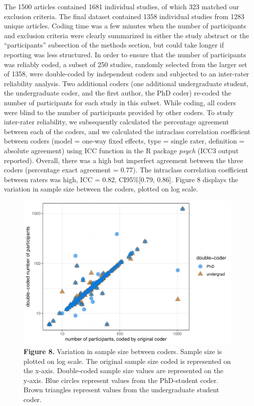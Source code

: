 \documentclass[
  man,floatsintext]{apa6}
\begin{document}
The 1500 articles contained 1681 individual studies, of which 323 matched our exclusion criteria. The final dataset contained 1358 individual studies from 1283 unique articles. Coding time was a few minutes when the number of participants and exclusion criteria were clearly summarized in either the study abstract or the ``participants'' subsection of the methods section, but could take longer if reporting was less structured. In order to ensure that the number of participants was reliably coded, a subset of 250 studies, randomly selected from the larger set of 1358, were double-coded by independent coders and subjected to an inter-rater reliability analysis. Two additional coders (one additional undergraduate student, the undergraduate coder, and the first author, the PhD coder) re-coded the number of participants for each study in this subset. While coding, all coders were blind to the number of participants provided by other coders. To study inter-rater reliability, we subsequently calculated the percentage agreement between each of the coders, and we calculated the intraclass correlation coefficient between coders (model = one-way fixed effects, type = single rater, definition = absolute agreement) using ICC function in the R package \emph{psych} (ICC3 output reported). Overall, there was a high but imperfect agreement between the three coders (percentage exact agreement = 0.77). The intraclass correlation coefficient between raters was high, ICC = 0.82, CI95\%{[}0.79, 0.86{]}. Figure 8 displays the variation in sample size between the coders, plotted on log scale.

\begin{figure}
\centering
\includegraphics{RVcn_feasibility_in_social_neuroscience_cortex_files/figure-latex/fig8-1.pdf}
\caption{\label{fig:fig8}\textbf{Figure 8.} Variation in sample size between coders. Sample size is plotted on log scale. The original sample size coded is represented on the x-axis. Double-coded sample size values are represented on the y-axis. Blue circles represent values from the PhD-student coder. Brown triangles represent values from the undergraduate student coder.}
\end{figure}
\end{document}
